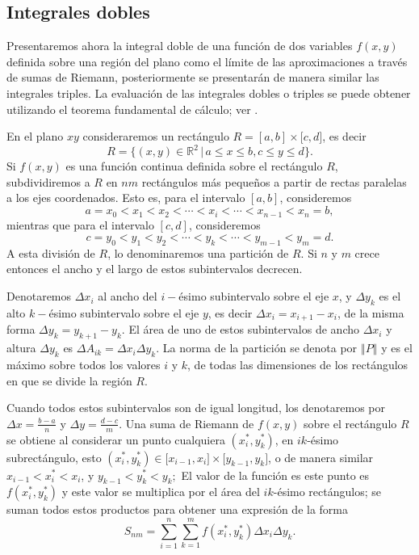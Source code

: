 \subsection{Integrales dobles} \label{integralesdobles}  
Presentaremos ahora la integral doble de una función de
dos variables $f(x,y)$ definida sobre una región del plano como el
límite de las aproximaciones a través de sumas de Riemann, posteriormente
se presentarán de manera similar las integrales triples.
La evaluación de las integrales dobles o triples se puede obtener
utilizando el teorema fundamental de cálculo; ver \cite{apostol_calculus_1999}.

En el plano $xy$ consideraremos un rectángulo $R=[a,b]\times \lbrack c,d]$, es decir
$$R=\{(x,y) \in \mathbb{R}^{2}\, | \,a\leq x\leq b,c\leq y\leq d\}.$$
Si $f(x,y)$ es una función continua definida sobre el rectángulo $R$,
subdividiremos a $R$ en $nm$ rectángulos más pequeños a partir
de rectas paralelas a los ejes coordenados. Esto es, para el intervalo $[a,b]$, consideremos
$$a=x_{0}<x_{1}<x_{2}<\cdots <x_{i}<\cdots <x_{n-1}<x_{n}=b,$$ mientras que
para el intervalo $[c,d]$, consideremos
$$c=y_{0}<y_{1}<y_{2}<\cdots <y_{k}<\cdots <y_{m-1}<y_{m}=d.$$ A esta división de $R$, lo denominaremos una partición de $R$.
Si $n$ y $m$ crece entonces el ancho y el largo de estos subintervalos decrecen.

Denotaremos $\Delta x_{i}$ al ancho del $i-$ésimo subintervalo
sobre el eje $x$, y $\Delta y_{k}$ es el alto $k-$ésimo subintervalo sobre el eje $y$,
es decir $\Delta x_{i}=x_{i+1}-x_{i}$, de la misma forma $\Delta
y_{k}=y_{k+1}-y_{k}$. El área de uno de estos subintervalos de ancho $\Delta x_{i}$ y altura $\Delta y_{k}$ es
$\Delta A_{ik}=\Delta x_{i}\Delta y_{k}$.
La norma de la partición se denota por $\left\Vert P\right\Vert$ y es el máximo sobre todos los valores
$i$ y $k$, de todas las dimensiones de los rectángulos en que se divide la región $R$.

Cuando todos estos subintervalos son de igual longitud, los denotaremos por $\Delta x=\frac{b-a}{n}$ y $\Delta y=\frac{d-c}{m}$.
Una suma de Riemann de $f(x,y) $ sobre el rectángulo $R$ se obtiene al considerar un punto cualquiera
$\left( x_{i}^{\ast },y_{k}^{\ast}\right) $, en $ik$-ésimo subrectángulo, esto
$\left( x_{i}^{\ast},y_{k}^{\ast }\right) \in \lbrack x_{i-1},x_{i}]\times \lbrack y_{k-1},y_{k}]$,
o de manera similar $x_{i-1}<x_{i}^{\ast }<x_{i}$, y $y_{k-1}<y_{k}^{\ast }<y_{k};$
El valor de la función es este punto es $f\left( x_{i}^{\ast},y_{k}^{\ast }\right) $ y este valor se
multiplica por el área del $ik$-ésimo rectángulos; se suman todos estos productos para obtener una
expresión de la forma
$$S_{nm}=\sum_{i=1}^{n}\sum_{k=1}^{m}f\left( x_{i}^{\ast },y_{k}^{\ast}\right) \Delta x_{i}\Delta y_{k}.$$

